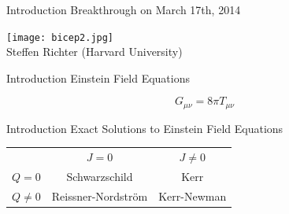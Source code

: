 \documentclass[xcolor=dvipsnames]{beamer}
\begin{document}
	\begin{frame}{Introduction}
		Breakthrough on March 17th, 2014
		\begin{center}
			\texttt{[image: bicep2.jpg]}\\
			\tiny{Steffen Richter (Harvard University)}
		\end{center}
	\end{frame}
	\begin{frame}{Introduction}
		Einstein Field Equations
		\huge
		\begin{center}
			\[
			G_{\mu\nu} = 8\pi T_{\mu\nu}
			\]
		\end{center}
	\end{frame}
	\begin{frame}{Introduction}
		Exact Solutions to Einstein Field Equations
		\begin{center}
			\Large
			\begin{tabular}{|c c c|}
				\hline
				\cellcolor[gray]{0.7}~ & \cellcolor[gray]{0.9}$J=0$ & $J \ne 0$ \\
				\rowcolor[gray]{0.9}$Q=0$ & \cellcolor[gray]{1.0}Schwarzschild & \cellcolor[gray]{0.7}Kerr \\
				\cellcolor[gray]{1.0}$Q\ne 0$ & \cellcolor[gray]{0.7}Reissner-Nordstr\"{o}m & \cellcolor[gray]{0.9}Kerr-Newman\\ \hline
			\end{tabular}
		\end{center}
	\end{frame}
\end{document}
